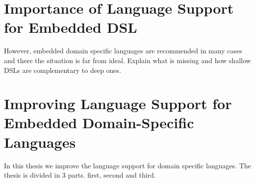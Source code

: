 \section{Importance of Language Support for Embedded DSL}
\label{sec:importance-of-language-support}



However, embedded domain specific languages are recommended in many cases and there
the situation is far from ideal. Explain what is missing and how shallow DSLs are complementary
to deep ones.


\section{Improving Language Support for Embedded Domain-Specific Languages}
\label{sec:improving-language-support}

In this thesis we improve the language support for domain specific languages. The
thesis is divided in 3 parts. first, second and third.



%
%

%
%


%
%



%
%





